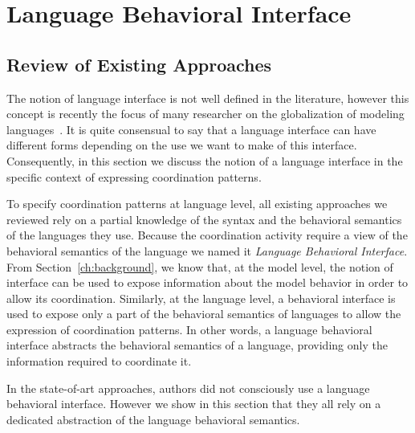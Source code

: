 \section{Language Behavioral Interface}
\subsection{Review of Existing Approaches}

The notion of language interface is not well defined in the literature, however this concept is recently the focus of many researcher on the globalization of modeling languages~\cite{GML_ch1,GML_ch3,GML_ch4,degueule2015melange}. It is quite consensual to say that a language interface can have different forms depending on the use we want to make of this interface. Consequently, in this section we discuss the notion of a language interface in the specific context of expressing coordination patterns. 

To specify coordination patterns at language level, all existing approaches we reviewed rely on a partial knowledge of the syntax and the behavioral semantics of the languages they use. Because the coordination activity require a view of the behavioral semantics of the language we named it \emph{Language Behavioral Interface}. From Section~\ref{ch:background}, we know that, at the model level, the notion of interface can be used to expose information about the model behavior in order to allow its coordination. Similarly, at the language level, a behavioral interface is used to expose only a part of the behavioral semantics of languages to allow the expression of coordination patterns. In other words, a language behavioral interface abstracts the behavioral semantics of a language, providing only the information required to coordinate it. 


In the state-of-art approaches, authors did not consciously use a language behavioral interface. However we show in this section that they all rely on a dedicated abstraction of the language behavioral semantics. 

